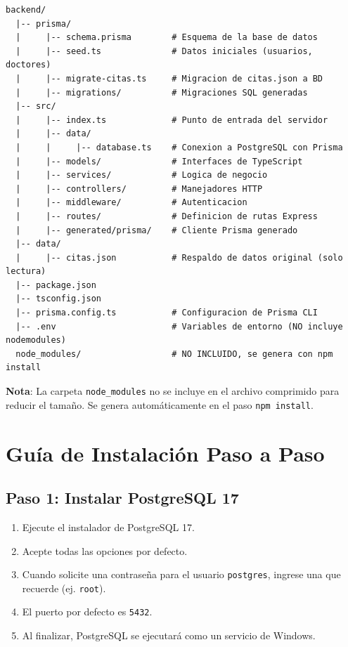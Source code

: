 \documentclass[12pt,a4paper]{article}
\begin{document}
\begin{lstlisting}
backend/
  |-- prisma/
  |     |-- schema.prisma        # Esquema de la base de datos
  |     |-- seed.ts              # Datos iniciales (usuarios, doctores)
  |     |-- migrate-citas.ts     # Migracion de citas.json a BD
  |     |-- migrations/          # Migraciones SQL generadas
  |-- src/
  |     |-- index.ts             # Punto de entrada del servidor
  |     |-- data/
  |     |     |-- database.ts    # Conexion a PostgreSQL con Prisma
  |     |-- models/              # Interfaces de TypeScript
  |     |-- services/            # Logica de negocio
  |     |-- controllers/         # Manejadores HTTP
  |     |-- middleware/          # Autenticacion
  |     |-- routes/              # Definicion de rutas Express
  |     |-- generated/prisma/    # Cliente Prisma generado
  |-- data/
  |     |-- citas.json           # Respaldo de datos original (solo lectura)
  |-- package.json
  |-- tsconfig.json
  |-- prisma.config.ts           # Configuracion de Prisma CLI
  |-- .env                       # Variables de entorno (NO incluye nodemodules)
  node_modules/                  # NO INCLUIDO, se genera con npm install
\end{lstlisting}

\textbf{Nota}: La carpeta \texttt{node\_modules} no se incluye en el archivo comprimido para reducir el tamaño. Se genera automáticamente en el paso \texttt{npm install}.

\section{Guía de Instalación Paso a Paso}

\subsection{Paso 1: Instalar PostgreSQL 17}
\begin{enumerate}
    \item Ejecute el instalador de PostgreSQL 17.
    \item Acepte todas las opciones por defecto.
    \item Cuando solicite una contraseña para el usuario \texttt{postgres}, ingrese una que recuerde (ej. \texttt{root}).
    \item El puerto por defecto es \texttt{5432}.
    \item Al finalizar, PostgreSQL se ejecutará como un servicio de Windows.
\end{enumerate}
\end{document}

